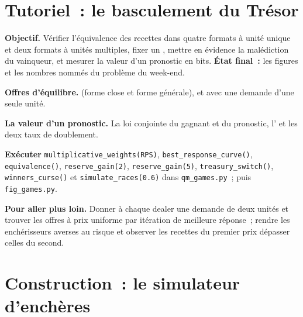 \section{Tutoriel~: le basculement du Trésor}\label{tut:qm:games-auctions-and-information:switch}

\begin{tutorial}
\textbf{Objectif.} Vérifier l'équivalence des recettes dans quatre formats à unité unique et deux formats à unités multiples, fixer un , mettre en évidence la malédiction du vainqueur, et mesurer la valeur d'un pronostic en bits. \textbf{État final~:} les
figures et les nombres nommés du problème du week-end.
\begin{tutsteps}
\item \textbf{Offres d'équilibre.}  (forme close et forme générale), et  avec une demande d'une seule unité.
\item \textbf{La valeur d'un pronostic.} La loi conjointe du gagnant et du pronostic, l' et les deux taux de doublement.
\item \textbf{Exécuter} \texttt{multiplicative\_weights(RPS)}, \texttt{best\_response\_curve()}, \texttt{equivalence()}, \texttt{reserve\_gain(2)}, \texttt{reserve\_gain(5)}, \texttt{treasury\_switch()},
\texttt{winners\_curse()} et \texttt{simulate\_races(0.6)} dans \texttt{qm\_games.py}~; puis \texttt{fig\_games.py}.
\end{tutsteps}
\textbf{Pour aller plus loin.} Donner à chaque dealer une demande de deux unités et trouver les offres à prix uniforme par itération de meilleure réponse~; rendre les enchérisseurs averses au risque et observer les recettes du premier prix dépasser celles du second.
\end{tutorial}

\section{Construction~: le simulateur d'enchères}\label{bld:qm:games-auctions-and-information:bidding}


